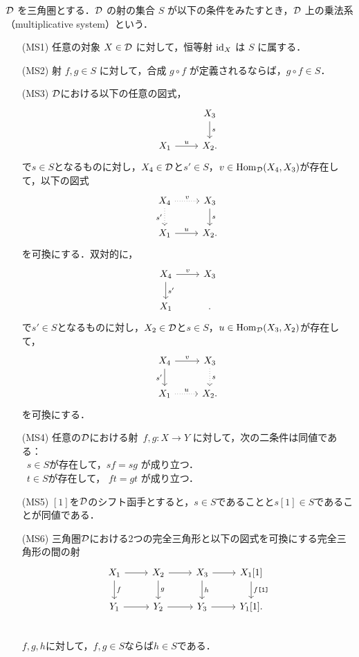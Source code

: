 \begin{defn}[乗法系]\cite[p.152]{KS06}\label{multiplicative}
${\mathcal D}$ を三角圏とする．${\mathcal D}$ の射の集合 $S$ が以下の条件をみたすとき，${\mathcal D}$ 上の乗法系（multiplicative system）という．
\begin{itemize}
  \item[(MS1)] 任意の対象 $X \in {\mathcal D}$ に対して，恒等射 $\mathrm{id}_X$ は $S$ に属する．
  
  \item[(MS2)] 射 $f, g \in S$ に対して，合成 $g \circ f$ が定義されるならば，$g \circ f \in S$．
  
  \item[(MS3)] ${\mathcal D}$における以下の任意の図式，
  \[
  \begin{tikzcd}
		& X_3 \ar[d, "s"] \\
  X_1 \ar[r, "u"] & X_2.
  \end{tikzcd}
  \]
	で$s\in S$となるものに対し，$X_4\in{\mathcal D}$と$s'\in S$，$v\in\operatorname{\mathrm{Hom}}_{{\mathcal D}}(X_4,X_3)$が存在して，以下の図式
  \[
  \begin{tikzcd}
  X_4 \ar[r,dotted,"v"] \ar[d, "s'"',dotted] & X_3 \ar[d, "s"] \\
  X_1 \ar[r, "u"] & X_2.
  \end{tikzcd}
  \]
	を可換にする．双対的に，
  \[
  \begin{tikzcd}
		X_4\ar[r,"v"]\ar[d,"s'"]& X_3\\
  X_1  & .
  \end{tikzcd}
  \]
	で$s'\in S$となるものに対し，$X_2\in{\mathcal D}$と$s\in S$，$u\in\operatorname{\mathrm{Hom}}_{{\mathcal D}}(X_3,X_2)$が存在して，
  \[
  \begin{tikzcd}
  X_4 \ar[r,"v"] \ar[d, "s'"'] & X_3 \ar[d, "s",dotted] \\
  X_1 \ar[r, "u",dotted] & X_2.
  \end{tikzcd}
  \]
	を可換にする．
\item[(MS4)]
任意の${\mathcal D}$における射\ $f,g: X \to Y$ に対して，次の二条件は同値である：\\
   \bullet\ $s \in S$が存在して，$sf = sg$ が成り立つ．\\
	\bullet\ 	$t \in S$が存在して， $ft = gt$ が成り立つ．

\item[(MS5)]
	$[1]$を${\mathcal D}$のシフト函手とすると，$s\in S$であることと$s[1]\in S$であることが同値である．
\item[(MS6)]
三角圏${\mathcal D}$における2つの完全三角形と以下の図式を可換にする完全三角形の間の射
			\[
		\begin{tikzcd}
			X_1\ar[r]\ar[d,"f"]& X_2\ar[r]\ar[d,"g"]& X_3\ar[r]\ar[d,"h"] & X_1[1]\ar[d,"f\texttt{[1]}"]\\
			Y_1\ar[r]& Y_2\ar[r]& Y_3\ar[r] & Y_1[1].\\
		\end{tikzcd}
			\]
$f,g,h$に対して，$f,g\in S$ならば$h\in S$である．
\end{itemize}
\end{defn}

